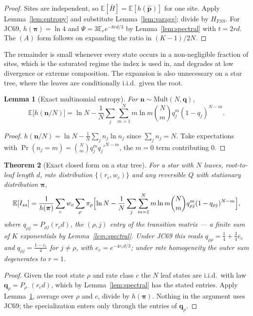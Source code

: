 \documentclass[preprint,12pt,authoryear]{elsarticle}
\newcommand{\Iss}{I_{ss}}
\newcommand{\Hbar}{\bar H}
\newcommand{\HFSS}{H_{FSS}}
\newcommand{\bpi}{\boldsymbol{\pi}}
\newcommand{\E}{\mathbb{E}}
\newcommand{\Mult}{\mathrm{Mult}}
\newtheorem{theorem}{Theorem}
\newtheorem{lemma}[theorem]{Lemma}
\theoremstyle{definition}
\theoremstyle{remark}
\begin{document}
\begin{proof}
Sites are independent, so $\E[\Hbar]=\E[h(\hat{\mathbf p})]$ for one site.
Apply Lemma~\ref{lem:entropy} and substitute Lemma~\ref{lem:varagg}; divide by
$\HFSS$. For JC69, $h(\bpi)=\ln4$ and $\Psi=3\E_r e^{-8rd/3}$ by
Lemma~\ref{lem:spectral} with $t=2rd$. The $(A)$ form follows on expanding
the ratio in $(K-1)/2N$.
\end{proof}

The remainder is small whenever every state occurs in a non-negligible
fraction of sites, which is the saturated regime the index is used in, and
degrades at low divergence or extreme composition. The expansion is also
unnecessary on a star tree, where the leaves are conditionally i.i.d.\ given
the root.

\begin{lemma}[Exact multinomial entropy]
\label{lem:multinomial}
For $\mathbf n\sim\Mult(N,\mathbf q)$,
\begin{equation}
  \E\bigl[h(\mathbf n/N)\bigr]=\ln N-\frac1N\sum_j\sum_{m=1}^{N}
  m\ln m\binom Nm q_j^{m}(1-q_j)^{N-m}.
\end{equation}
\end{lemma}

\begin{proof}
$h(\mathbf n/N)=\ln N-\frac1N\sum_jn_j\ln n_j$ since $\sum_jn_j=N$. Take
expectations with $\Pr(n_j=m)=\binom Nm q_j^mq_j'^{N-m}$, the $m=0$ term
contributing $0$.
\end{proof}

\begin{theorem}[Exact closed form on a star tree]
\label{thm:exact}
For a star with $N$ leaves, root-to-leaf length $d$, rate distribution
$\{(r_c,w_c)\}$ and \emph{any} reversible $Q$ with stationary distribution
$\bpi$,
\begin{equation}
  \E[\Iss]=\frac{1}{h(\bpi)}\sum_c w_c\sum_\rho\pi_\rho
  \Bigl[\ln N-\frac1N\sum_j\sum_{m=1}^{N}m\ln m\binom Nm
  q_{\rho j}^{m}(1-q_{\rho j})^{N-m}\Bigr],
  \label{eq:exactstar}
\end{equation}
where $q_{\rho j}=P_{\rho j}(r_cd)$, the $(\rho,j)$ entry of the transition
matrix --- a finite sum of $K$ exponentials by Lemma~\ref{lem:spectral}.
Under JC69 this reads $q_{\rho\rho}=\tfrac14+\tfrac34e_c$ and
$q_{\rho j}=\tfrac{1-e_c}{4}$ for $j\ne\rho$, with $e_c=e^{-4r_cd/3}$; under
rate homogeneity the outer sum degenerates to $r=1$.
\end{theorem}

\begin{proof}
Given the root state $\rho$ and rate class $c$ the $N$ leaf states are
i.i.d.\ with law $\mathbf q_\rho=P_{\rho\cdot}(r_cd)$, which by
Lemma~\ref{lem:spectral} has the stated entries. Apply
Lemma~\ref{lem:multinomial}, average over $\rho$ and $c$, divide by $h(\bpi)$.
Nothing in the argument uses JC69; the specialization enters only through the
entries of $\mathbf q_\rho$.
\end{proof}
\end{document}
